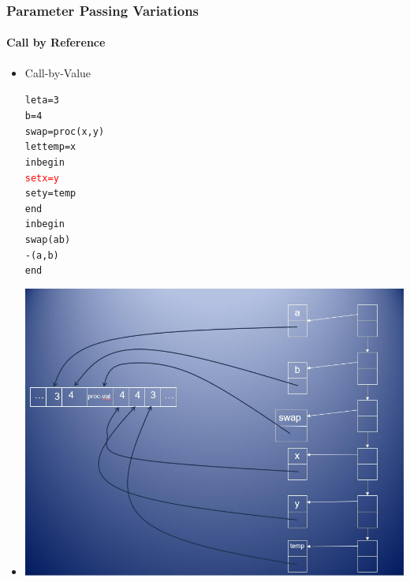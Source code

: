 \documentclass{beamer}
\begin{document}
\begin{frame}[fragile]
\frametitle{Parameter Passing Variations}
\framesubtitle{Call by Reference}
\begin{scriptsize}
\begin{itemize}
\item<1-> Call-by-Value
\begin{alltt}
\begin{tiny}
let a = 3
    b = 4
    swap = proc (x, y)
	        let temp = x
	        in begin
	             \textcolor{red}{set x = y}
	             set y = temp
	           end
in begin
     swap(a b)
     -(a, b)
   end
\end{tiny}
\end{alltt}

\item<1->
\begin{center}
\includegraphics[scale=0.35]{cbv-cbr4.jpg}
\end{center}

\end{itemize}
\end{scriptsize}
\end{frame}
\end{document}
